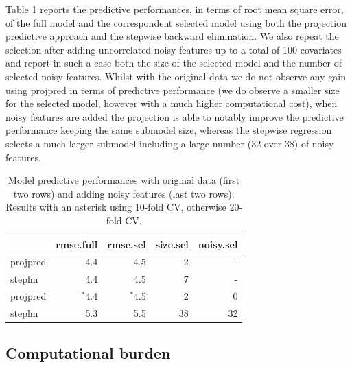 \documentclass[american,]{article}
\theoremstyle{definition}
\begin{document}
Table \ref{tab:model_performances} reports the predictive performances, in terms of root mean square error, of the full model and the correspondent selected model using both the projection predictive approach and the stepwise backward elimination. We also repeat the selection after adding uncorrelated noisy features up to a total of 100 covariates and report in such a case both the size of the selected model and the number of selected noisy features. Whilst with the original data we do not observe any gain using projpred in terms of predictive performance (we do observe a smaller size for the selected model, however with a much higher computational cost), when noisy features are added the projection is able to notably improve the predictive performance keeping the same submodel size, whereas the stepwise regression selects a much larger submodel including a large number (32 over 38) of noisy features.

\begin{table}[tp]
\scriptsize
\centering
\begin{tabular}{l|r|r|r|r}
  \hline
 & rmse.full & rmse.sel & size.sel & noisy.sel \\ 
  \hline
projpred & 4.4 & 4.5 & 2 & -  \\
steplm & 4.4 & 4.5 & 7 & - \\
\hline
\hline
projpred & $^{*}$4.4 & $^{*}$4.5 & 2 & 0  \\
steplm & 5.3 & 5.5 & 38 & 32 \\
   \hline
\end{tabular}
\caption{Model predictive performances with original data (first two rows) and adding noisy features (last two rows). Results with an asterisk using 10-fold CV, otherwise 20-fold CV.}
\label{tab:model_performances}
\end{table}

\hypertarget{computational-burden}{%
\subsection{Computational burden} \label{computational-burden}}
\end{document}
